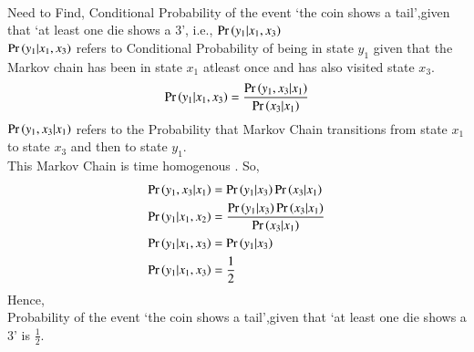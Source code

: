 \documentclass[journal,12pt,twocolumn]{IEEEtran}
\begin{document}
\\ Need to Find, Conditional Probability of the event `the coin shows a tail',given that `at least one die shows a 3', i.e., $\Pr\left(y_1|x_1,x_3\right) $
\\$\Pr\left(y_1|x_1,x_3\right)$ refers to Conditional Probability of being in state $y_1$ given that the Markov chain has been in state $x_1$ atleast once and has also visited state $x_3$.
\begin{align}
       \Pr\left(y_1|x_1,x_3\right) = \frac{\Pr\left(y_1,x_3|x_1\right)}{\Pr\left(x_3|x_1\right)}
    \end{align}
$\Pr\left(y_1,x_3|x_1\right)$ refers to the Probability that Markov Chain transitions from state $x_1$ to state $x_3$ and then to state $y_1$.
\\This Markov Chain is time homogenous . So,
\begin{align}
        \Pr\left(y_1,x_3|x_1\right) &= \Pr\left(y_1|x_3\right)\Pr\left(x_3|x_1\right)\\
        \Pr\left(y_1|x_1,x_2\right) &=\frac{\Pr\left(y_1|x_3\right)\Pr\left(x_3|x_1\right)}{\Pr\left(x_3|x_1\right)}\\
        \Pr\left(y_1|x_1,x_3\right) &= \Pr\left(y_1|x_3\right)\\
        \Pr\left(y_1|x_1,x_3\right) &= \frac{1}{2}
    \end{align}
Hence,
\\Probability of the event `the coin shows a tail',given that `at least one die shows a 3' is $\frac{1}{2}$.
\end{document}
